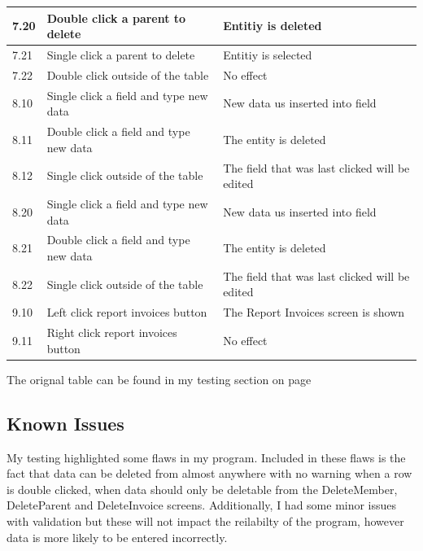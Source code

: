 \begin{center}
\begin{longtable}{|p{2cm}|p{5cm}|p{8cm}|}
       \rowcolor{lightgrey} 7.20 & Double click a parent to delete & Entitiy is deleted \\ \hline
       \rowcolor{lightgrey} 7.21 & Single click a parent to delete & Entitiy is selected\\ \hline
       \rowcolor{lightgrey} 7.22 & Double click outside of the table & No effect \\ \hline
        
       \rowcolor{lightgrey} 8.10 & Single click a field and type new data & New data us inserted into field \\ \hline
       \rowcolor{lightgrey} 8.11 & Double click a field and type new data & The entity is deleted \\ \hline
       \rowcolor{lightgrey} 8.12 & Single click outside of the table & The field that was last clicked will be edited \\ \hline
        
       \rowcolor{lightgrey} 8.20 & Single click a field and type new data &  New data us inserted into field \\ \hline
       \rowcolor{lightgrey} 8.21 & Double click a field and type new data & The entity is deleted \\ \hline
       \rowcolor{lightgrey} 8.22 & Single click outside of the table & The field that was last clicked will be edited \\ \hline

       \rowcolor{lightgrey} 9.10 & Left click report invoices button & The Report Invoices screen is shown \\ \hline
       \rowcolor{lightgrey} 9.11 & Right click report invoices button & No effect \\ \hline
    \end{longtable}
\end{center}

The orignal table can be found in my testing section on page \pageref{testing_section}

\subsection{Known Issues}
My testing highlighted some flaws in my program. Included in these flaws is the fact that data can be deleted from almost anywhere with no warning when a row is double clicked, when data should only be deletable from the DeleteMember, DeleteParent and DeleteInvoice screens. Additionally, I had some minor issues with validation but these will not impact the reilabilty of the program, however data is more likely to be entered incorrectly.

